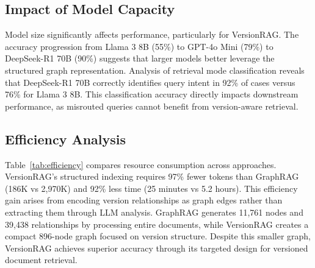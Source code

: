 \subsection{Impact of Model Capacity}

Model size significantly affects performance, particularly for VersionRAG. The accuracy progression from Llama 3 8B (55\%) to GPT-4o Mini (79\%) to DeepSeek-R1 70B (90\%) suggests that larger models better leverage the structured graph representation. Analysis of retrieval mode classification reveals that DeepSeek-R1 70B correctly identifies query intent in 92\% of cases versus 76\% for Llama 3 8B. This classification accuracy directly impacts downstream performance, as misrouted queries cannot benefit from version-aware retrieval.

\subsection{Efficiency Analysis}

Table~\ref{tab:efficiency} compares resource consumption across approaches. VersionRAG's structured indexing requires 97\% fewer tokens than GraphRAG (186K vs 2,970K) and 92\% less time (25 minutes vs 5.2 hours). This efficiency gain arises from encoding version relationships as graph edges rather than extracting them through LLM analysis. GraphRAG generates 11,761 nodes and 39,438 relationships by processing entire documents, while VersionRAG creates a compact 896-node graph focused on version structure. Despite this smaller graph, VersionRAG achieves superior accuracy through its targeted design for versioned document retrieval.

\begin{table}[hb]
\centering
\footnotesize
\caption{Efficiency comparison with DeepSeek-R1 70B. VersionRAG achieves highest accuracy with minimal resource consumption.}
\label{tab:efficiency}
\end{table}

